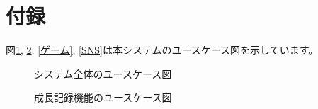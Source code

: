 \documentclass[a4j]{jarticle}
\begin{document}
\newpage
\appendix
\section{付録}
図\ref{全体}, \ref{成長記録}, \ref{ゲーム}, \ref{SNS}は本システムのユースケース図を示しています。

\begin{figure}[H]
  \begin{center}
    \caption{システム全体のユースケース図}
    \label{全体}
  \end{center}
\end{figure}

\begin{figure}[H]
  \begin{center}
    \caption{成長記録機能のユースケース図}
    \label{成長記録}
  \end{center}
\end{figure}
\end{document}
